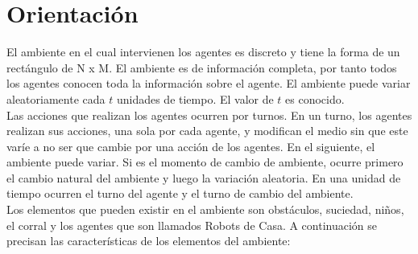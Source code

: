 \documentclass{book}
\begin{document}
	\section{Orientaci\'on}
	El ambiente en el cual intervienen los agentes es discreto y tiene la forma de un rect\'angulo de N x M. El ambiente es de informaci\'on completa, por tanto todos los agentes conocen toda la informaci\'on sobre el agente. El ambiente puede variar aleatoriamente cada $t$ unidades de tiempo. El valor de $t$ es conocido. \\
	Las acciones que realizan los agentes ocurren por turnos. En un turno, los agentes realizan sus acciones, una sola por cada agente, y modifican el medio sin que este var\'ie a no ser que cambie por una acci\'on de los agentes. En el siguiente, el ambiente puede variar. Si es el momento de cambio de ambiente, ocurre primero el cambio natural del ambiente y luego la variaci\'on aleatoria. En una unidad de tiempo ocurren el turno del agente y el turno de cambio del ambiente. \\
	Los elementos que pueden existir en el ambiente son obst\'aculos, suciedad, ni\~nos, el corral y los agentes que son llamados Robots de Casa. A continuaci\'on se precisan las caracter\'isticas de los elementos del ambiente:
\end{document}
